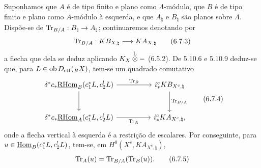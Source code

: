 Suponhamos que $A$ é de tipo finito e plano como $\Lambda$-módulo, que $B$ é de tipo finito e plano como $A$-módulo à esquerda, e que $A_{\natural}$ e $B_{\natural}$ são planos sobre $\Lambda$. Dispõe-se de $\operatorname{Tr}_{B/A}:B_{\natural}\to A_{\natural}$; continuaremos denotando por
\begin{equation}
\operatorname{Tr}_{B/A}:KB_{X,\natural}\longrightarrow KA_{X,\natural}
\tag{6.7.3}
\end{equation}
a flecha que dela se deduz aplicando $K_X\overset{\mathrm L}{\otimes} -$ (6.5.2). De 5.10.6 e 5.10.9 deduz-se que, para $L\in\operatorname{ob} D_{\mathrm{ctf}}({}_BX)$, tem-se um quadrado comutativo
\begin{equation}
\begin{tikzcd}[column sep=huge,row sep=large]
\delta^*c_*\uRHom_B(c_1^*L,c_2^!L) \arrow[r,"\Tr_B"] \arrow[d]
& i_*^cKB_{X^c,\natural} \arrow[d,"\Tr_{B/A}"]\\
\delta^*c_*\uRHom_A(c_1^*L,c_2^!L) \arrow[r,"\Tr_A"']
& i_*^cKA_{X^c,\natural},
\end{tikzcd}
\tag{6.7.4}
\end{equation}
onde a flecha vertical à esquerda é a restrição de escalares. Por conseguinte, para $u\in\underline{\operatorname{Hom}}_B(c_1^*L,c_2^!L)$, tem-se, em $H^0(X^c,KA_{X^c,\natural})$,
\begin{equation}
\operatorname{Tr}_A(u)=\operatorname{Tr}_{B/A}(\operatorname{Tr}_B(u)).
\tag{6.7.5}
\end{equation}
